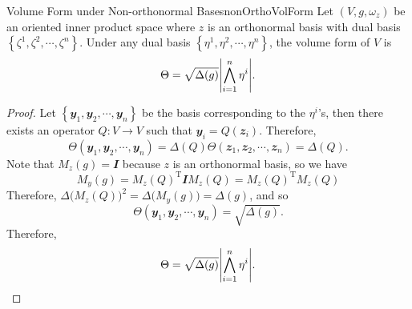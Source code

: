 \documentclass[math, code]{amznotes}
\theoremstyle{remark}
\newcommand{\I}{\mathbfit{I}}
\begin{document}
\begin{probox}{Volume Form under Non-orthonormal Bases}{nonOrthoVolForm}
    Let $(V, g, \omega_z)$ be an oriented inner product space where $z$ is an orthonormal basis with dual basis $\left\{\zeta^1, \zeta^2, \cdots, \zeta^n\right\}$. Under any dual basis $\left\{\eta^1, \eta^2, \cdots, \eta^n\right\}$, the volume form of $V$ is 
    \begin{equation*}
        \Theta = \sqrt{\Delta(g)}{\left\lvert {\bigwedge_{i = 1}^n\eta^i} \right\rvert}.
    \end{equation*}
    \tcblower
    \begin{proof}
        Let $\left\{\mathbfit{y}_1, \mathbfit{y}_2, \cdots, \mathbfit{y}_n\right\}$ be the basis corresponding to the $\eta^i$'s, then there exists an operator $Q \colon V \to V$ such that $\mathbfit{y}_i = Q\left(\mathbfit{z}_i\right)$. Therefore, 
        \begin{equation*}
            \Theta\left(\mathbfit{y}_1, \mathbfit{y}_2, \cdots, \mathbfit{y}_n\right) = \Delta(Q)\Theta\left(\mathbfit{z}_1, \mathbfit{z}_2, \cdots, \mathbfit{z}_n\right) = \Delta(Q).
        \end{equation*}
        Note that $M_z(g) = \I$ because $z$ is an orthonormal basis, so we have 
        \begin{equation*}
            M_y(g) = M_z(Q)^{\mathrm{T}}\I M_z(Q) = M_z(Q)^{\mathrm{T}}M_z(Q)
        \end{equation*}
        Therefore, $\Delta\bigl(M_z(Q)\bigr)^2 = \Delta\bigl(M_y(g)\bigr) = \Delta(g)$, and so 
        \begin{equation*}
            \Theta\left(\mathbfit{y}_1, \mathbfit{y}_2, \cdots, \mathbfit{y}_n\right) = \sqrt{\Delta(g)}.
        \end{equation*}
        Therefore, 
        \begin{equation*}
            \Theta = \sqrt{\Delta(g)}{\left\lvert {\bigwedge_{i = 1}^n\eta^i} \right\rvert}.
        \end{equation*}
    \end{proof}
\end{probox}
\end{document}
